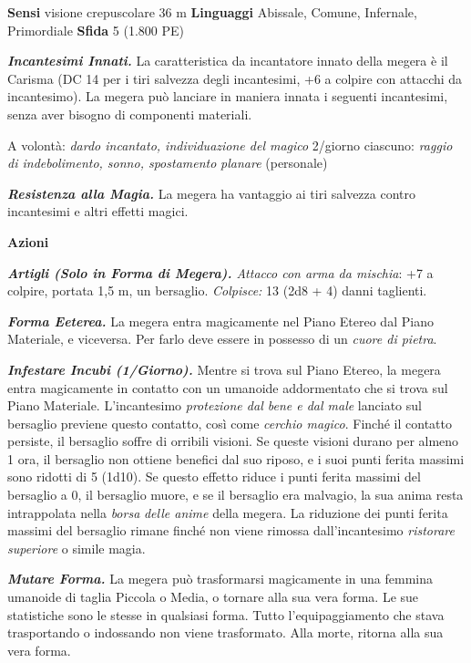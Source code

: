 \begin{multicols}{2}
\textbf{Sensi} visione crepuscolare 36 m
\textbf{Linguaggi} Abissale, Comune, Infernale, Primordiale
\textbf{Sfida} 5 (1.800 PE)

\emph{\textbf{Incantesimi Innati.}} La caratteristica da incantatore
innato della megera è il Carisma (DC 14 per i tiri salvezza degli
incantesimi, +6 a colpire con attacchi da incantesimo). La megera può
lanciare in maniera innata i seguenti incantesimi, senza aver bisogno di
componenti materiali.

A volontà: \emph{dardo incantato, individuazione del magico} 2/giorno
ciascuno: \emph{raggio di indebolimento, sonno, spostamento}
\emph{planare} (personale)

\emph{\textbf{Resistenza alla Magia.}} La megera ha vantaggio ai tiri
salvezza contro incantesimi e altri effetti magici.

\textbf{Azioni}

\emph{\textbf{Artigli (Solo in Forma di Megera).} Attacco con arma da
mischia}: +7 a colpire, portata 1,5 m, un bersaglio. \emph{Colpisce:} 13
(2d8 + 4) danni taglienti.

\emph{\textbf{Forma Eeterea.}} La megera entra magicamente nel Piano
Etereo dal Piano Materiale, e viceversa. Per farlo deve essere in
possesso di un \emph{cuore di pietra}.

\emph{\textbf{Infestare Incubi (1/Giorno).}} Mentre si trova sul Piano
Etereo, la megera entra magicamente in contatto con un umanoide
addormentato che si trova sul Piano Materiale. L'incantesimo
\emph{protezione dal bene e dal male} lanciato sul bersaglio previene
questo contatto, così come \emph{cerchio magico}. Finché il contatto
persiste, il bersaglio soffre di orribili visioni. Se queste visioni
durano per almeno 1 ora, il bersaglio non ottiene benefici dal suo
riposo, e i suoi punti ferita massimi sono ridotti di 5 (1d10). Se
questo effetto riduce i punti ferita massimi del bersaglio a 0, il
bersaglio muore, e se il bersaglio era malvagio, la sua anima resta
intrappolata nella \emph{borsa} \emph{delle anime} della megera. La
riduzione dei punti ferita massimi del bersaglio rimane finché non viene
rimossa dall'incantesimo \emph{ristorare} \emph{superiore} o simile
magia.

\emph{\textbf{Mutare Forma.}} La megera può trasformarsi magicamente in
una femmina umanoide di taglia Piccola o Media, o tornare alla sua vera
forma. Le sue statistiche sono le stesse in qualsiasi forma. Tutto
l'equipaggiamento che stava trasportando o indossando non viene
trasformato. Alla morte, ritorna alla sua vera forma.




\end{multicols}
